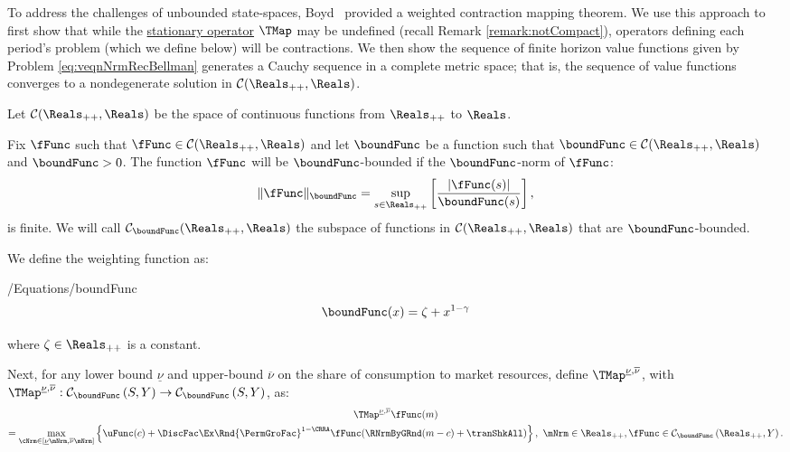 \documentclass[BufferStockTheory]{subfiles}
\begin{document}
To address the challenges of unbounded state-spaces, Boyd~\citeyearpar{jboydWeighted} provided a weighted contraction mapping theorem.
We use this approach to first show that while the \hyperlink{Stationary-Bellman-Operator}{stationary operator} $\TMap$ may be undefined (recall Remark \ref{remark:notCompact}), operators defining each period's problem (which we define below) will be contractions.
We then show the sequence of finite horizon value functions given by Problem \eqref{eq:veqnNrmRecBellman} generates a Cauchy sequence in a complete metric space; that is, the sequence of value functions converges to a nondegenerate solution in $\mathcal{C}(\Reals_{++},\Reals)$.

Let $\mathcal{C}(\Reals_{++},\Reals)$ be the space of continuous functions from $\Reals_{++}$ to $\Reals$.

\begin{comment}
check range $Y$ compatibility with space in Boyd.

check use of term null vector
\end{comment}

\begin{definition}
  Fix $\fFunc$ such that $\fFunc \in \mathcal{C}(\Reals_{++},\Reals)$ and let $\boundFunc$ be a function such that $\boundFunc\in \mathcal{C}(\Reals_{++},\Reals)$ and $\boundFunc >0$. The function $\fFunc$ will be $\boundFunc$-bounded if the $\boundFunc$-norm of $\fFunc$:
  \begin{equation}
    \Vert \fFunc\Vert _{\boundFunc }=\sup_{s\in \Reals_{++}}\left[ \frac{|\fFunc(s)|}{\boundFunc (s)}\right],
    \label{eq:phinorm}
  \end{equation}%
  is finite.
We will call $\mathcal{C}_{\boundFunc}(\Reals_{++},\Reals)$ the subspace of functions in $\mathcal{C}(\Reals_{++},\Reals)$ that are $\boundFunc$-bounded.
\end{definition}

We define the weighting function as:
%
\begin{verbatimwrite}{\econtexRoot/Equations/boundFunc}
\begin{equation}
\boundFunc(x) = \zeta + x^{1-\gamma}
\end{equation}
\end{verbatimwrite}

where $\zeta \in \Reals_{++}$ is a constant.

\newcommand{\MPCminInf}{\underline{\nu}}
\newcommand{\MPCmaxInf}{\overline{\nu}}
  
Next, for any lower bound $\MPCminInf$ and upper-bound $\MPCmaxInf$ on the share of consumption to market resources, define $\TMap^{\MPCminInf, \MPCmaxInf}$, with \textit{$\TMap^{\MPCminInf, \MPCmaxInf}:\mathcal{C}_{\boundFunc }\left( S,Y\right) \rightarrow \mathcal{C}_{\boundFunc }\left( S,Y\right) $}, as:
%
\begin{multline}
\TMap^{\MPCminInf, \MPCmaxInf} \fFunc(m) \\  = \max_{\cNrm \in
    [\MPCminInf \mNrm, \MPCmaxInf \mNrm]
  }  \left\{\uFunc(c) + \DiscFac\Ex\Rnd{\PermGroFac}^{1-\CRRA}\fFunc(\RNrmByGRnd(m - c) + \tranShkAll)\right\}, \,\,  \mNrm\in \Reals_{++}, \fFunc\in \mathcal{C}_{\boundFunc }\left(\Reals_{++},Y\right).
\end{multline}
\end{document}
